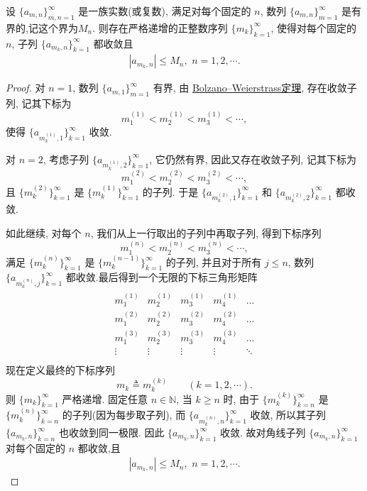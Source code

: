 \documentclass[../../main.tex]{subfiles}%
\begin{document}
\begin{proposition}[对角线法则]\label{proposition:对角线法则}
设 $\{a_{m,n}\}_{m,n=1}^{\infty}$ 是一族实数(或复数), 满足对每个固定的 $n$, 数列 $\{a_{m,n}\}_{m=1}^{\infty}$ 是有界的,记这个界为$M_n$.
则存在严格递增的正整数序列 $\{m_k\}_{k=1}^{\infty}$, 使得对每个固定的 $n$, 子列 $\{a_{m_k,n}\}_{k=1}^{\infty}$ 都收敛且
\begin{align*}
|a_{m_k,n}|\leqslant M_n,\,\,n=1,2,\cdots.
\end{align*}
\end{proposition}
\begin{proof}
对 $n=1$, 数列 $\{a_{m,1}\}_{m=1}^{\infty}$ 有界, 由 \hyperref[Real Analysis-theorem:R^n中的Bolzano--Weierstrass定理]{Bolzano--Weierstrass定理}, 存在收敛子列, 记其下标为
\[
m_1^{(1)} < m_2^{(1)} < m_3^{(1)} < \cdots,
\]
使得 $\{a_{m_k^{(1)},1}\}_{k=1}^{\infty}$ 收敛.

对 $n=2$, 考虑子列 $\{a_{m_k^{(1)},2}\}_{k=1}^{\infty}$, 它仍然有界, 因此又存在收敛子列, 记其下标为
\[
m_1^{(2)} < m_2^{(2)} < m_3^{(2)} < \cdots,
\]
且 $\{m_k^{(2)}\}_{k=1}^{\infty}$ 是 $\{m_k^{(1)}\}_{k=1}^{\infty}$ 的子列.
于是 $\{a_{m_k^{(2)},1}\}_{k=1}^{\infty}$ 和 $\{a_{m_k^{(2)},2}\}_{k=1}^{\infty}$ 都收敛.

如此继续, 对每个 $n$, 我们从上一行取出的子列中再取子列, 得到下标序列
\[
m_1^{(n)} < m_2^{(n)} < m_3^{(n)} < \cdots,
\]
满足 $\{m_k^{(n)}\}_{k=1}^{\infty}$ 是 $\{m_k^{(n-1)}\}_{k=1}^{\infty}$ 的子列, 并且对于所有 $j\leqslant n$, 数列 $\{a_{m_k^{(n)},j}\}_{k=1}^{\infty}$ 都收敛.最后得到一个无限的下标三角形矩阵
\begin{align*}
\begin{matrix}
m_{1}^{(1)}&		m_{2}^{(1)}&		m_{3}^{(1)}&		m_{4}^{(1)}&		...\\
m_{1}^{(2)}&		m_{2}^{(2)}&		m_{3}^{(2)}&		m_{4}^{(2)}&		...\\
m_{1}^{(3)}&		m_{2}^{(3)}&		m_{3}^{(3)}&		m_{4}^{(3)}&		...\\
\vdots&		\vdots&		\vdots&		\vdots&		\ddots\\
\end{matrix}
\end{align*}
现在定义最终的下标序列
\[
m_k \triangleq m_k^{(k)} \qquad (k=1,2,\cdots).
\]
则 $\{m_k\}_{k=1}^{\infty}$ 严格递增. 固定任意 $n\in \mathbb{N}$, 当 $k\geqslant n$ 时, 由于 $\{m_k^{(k)}\}_{k=n}^{\infty}$ 是 $\{m_k^{(n)}\}_{k=n}^{\infty}$ 的子列(因为每步取子列), 而 $\{a_{m_k^{(n)},n}\}_{k=1}^{\infty}$ 收敛, 所以其子列 $\{a_{m_k,n}\}_{k=n}^{\infty}$ 也收敛到同一极限. 因此 $\{a_{m_k,n}\}_{k=1}^{\infty}$ 收敛.
故对角线子列 $\{a_{m_k,n}\}_{k=1}^{\infty}$ 对每个固定的 $n$ 都收敛,且
\begin{align*}
|a_{m_k,n}|\leqslant M_n,\,\,n=1,2,\cdots.
\end{align*}
\end{proof}
\end{document}
